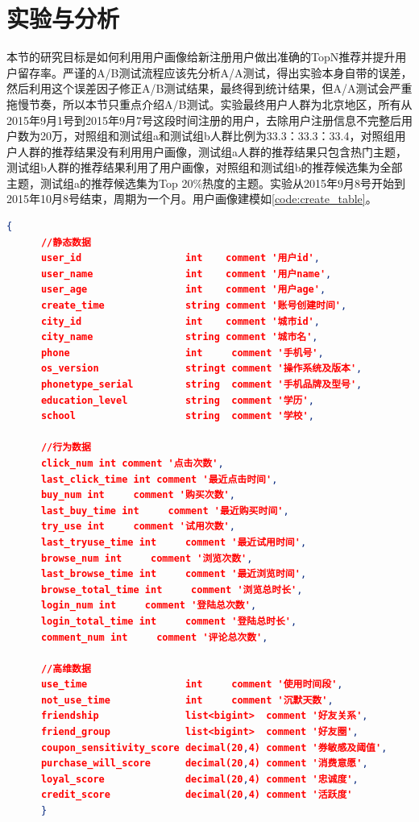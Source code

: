   \section{实验与分析}
  本节的研究目标是如何利用用户画像给新注册用户做出准确的TopN推荐并提升用户留存率。严谨的A/B测试流程应该先分析A/A测试，得出实验本身自带的误差，然后利用这个误差因子修正A/B测试结果，最终得到统计结果，但A/A测试会严重拖慢节奏，所以本节只重点介绍A/B测试。实验最终用户人群为北京地区，所有从2015年9月1号到2015年9月7号这段时间注册的用户，去除用户注册信息不完整后用户数为20万，对照组和测试组a和测试组b人群比例为33.3：33.3：33.4，对照组用户人群的推荐结果没有利用用户画像，测试组a人群的推荐结果只包含热门主题，测试组b人群的推荐结果利用了用户画像，对照组和测试组b的推荐候选集为全部主题，测试组a的推荐候选集为Top 20\%热度的主题。实验从2015年9月8号开始到2015年10月8号结束，周期为一个月。用户画像建模如\autoref{code:create_table}。
    \begin{lstlisting}[language=json,firstnumber=1,label={code:create_table}]
      {
      //静态数据
      user_id                  int    comment '用户id',
      user_name                int    comment '用户name',
      user_age                 int    comment '用户age',
      create_time              string comment '账号创建时间',
      city_id                  int    comment '城市id',
      city_name                string comment '城市名',
      phone                    int     comment '手机号',
      os_version               stringt comment '操作系统及版本',
      phonetype_serial         string  comment '手机品牌及型号',
      education_level          string  comment '学历',
      school                   string  comment '学校',

      //行为数据
      click_num int comment '点击次数',
      last_click_time int comment '最近点击时间',
      buy_num int     comment '购买次数',
      last_buy_time int     comment '最近购买时间',
      try_use int     comment '试用次数',
      last_tryuse_time int     comment '最近试用时间',
      browse_num int     comment '浏览次数',
      last_browse_time int     comment '最近浏览时间',
      browse_total_time int     comment '浏览总时长',
      login_num int     comment '登陆总次数',
      login_total_time int     comment '登陆总时长',
      comment_num int     comment '评论总次数',

      //高维数据
      use_time                 int     comment '使用时间段',
      not_use_time             int     comment '沉默天数',
      friendship               list<bigint>  comment '好友关系',
      friend_group             list<bigint>  comment '好友圈',
      coupon_sensitivity_score decimal(20,4) comment '券敏感及阈值',
      purchase_will_score      decimal(20,4) comment '消费意愿',
      loyal_score              decimal(20,4) comment '忠诚度',
      credit_score             decimal(20,4) comment '活跃度'
      }
    \end{lstlisting}
